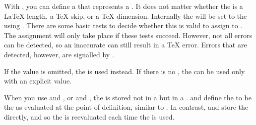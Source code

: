 \begin{Declaration}
\end{Declaration}
With , you can
define a  that represents a . It does not matter
whether the  is a \LaTeX{} length, a \TeX{} skip, or a \TeX{}
dimension. Internally the  will be set to the 
using . There are some basic tests to decide whether
this  is valid to assign to . The assignment will
only take place if these tests succeed. However, not all errors can be
detected, so an inaccurate  can still result in a \TeX{} error.
Errors that are detected, however, are signalled by
.

If the value is omitted, the
 is used instead. If there is no , the
 can be used only with an explicit value.

When you use  and ,
or  and , the
 is stored not in a  but in a
.  and
 define the  to be the
 as evaluated at the point of definition, similar to
. In contrast,
 and
 store the  directly, and
so the  is reevaluated each time the  is used.%
\EndIndexGroup



